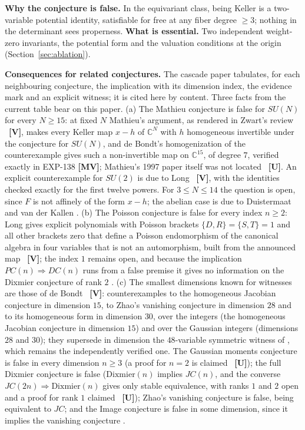 \documentclass[11pt]{article}
\theoremstyle{definition}
\theoremstyle{remark}
\newcommand{\C}{\mathbb{C}}
\newcommand{\MV}{\textbf{[MV]}}
\newcommand{\VV}{\textbf{[V]}}
\newcommand{\UU}{\textbf{[U]}}
\begin{document}
\textbf{Why the conjecture is false.} In the equivariant class, being Keller is a two-variable potential identity, satisfiable for free at any fiber degree $\ge 3$; nothing in the determinant sees properness. \textbf{What is essential.} Two independent weight-zero invariants, the potential form and the valuation conditions at the origin (Section~\ref{sec:ablation}).

\textbf{Consequences for related conjectures.} The cascade paper \cite{SLcascade} tabulates, for each neighbouring conjecture, the implication with its dimension index, the evidence mark and an explicit witness; it is cited here by content. Three facts from the current table bear on this paper. (a) The Mathieu conjecture is false for $SU(N)$ for every $N \ge 15$: at fixed $N$ Mathieu's argument, as rendered in Zwart's review \cite{Zwart2025}~\VV{}, makes every Keller map $x - h$ of $\C^N$ with $h$ homogeneous invertible under the conjecture for $SU(N)$, and de Bondt's homogenization of the counterexample \cite{deBondt2026} gives such a non-invertible map on $\C^{15}$, of degree $7$, verified exactly in EXP-138 \MV; Mathieu's 1997 paper itself was not located \cite{Mathieu1997}~\UU{}. An explicit counterexample for $SU(2)$ is due to Long \cite{LongSU2}~\VV{}, with the identities checked exactly for the first twelve powers. For $3 \le N \le 14$ the question is open, since $F$ is not affinely of the form $x - h$; the abelian case is due to Duistermaat and van der Kallen \cite{DvdK1998}. (b) The Poisson conjecture is false for every index $n \ge 2$: Long gives explicit polynomials with Poisson brackets $\{D,R\} = \{S,T\} = 1$ and all other brackets zero that define a Poisson endomorphism of the canonical algebra in four variables that is not an automorphism, built from the announced map \cite{LongPoisson}~\VV{}; the index $1$ remains open, and because the implication $PC(n) \Rightarrow DC(n)$ runs from a false premise it gives no information on the Dixmier conjecture of rank $2$ \cite{AvdE2007}. (c) The smallest dimensions known for witnesses are those of de Bondt \cite{deBondt2026}~\VV{}: counterexamples to the homogeneous Jacobian conjecture in dimension $15$, to Zhao's vanishing conjecture in dimension $28$ and to its homogeneous form in dimension $30$, over the integers (the homogeneous Jacobian conjecture in dimension $15$) and over the Gaussian integers (dimensions $28$ and $30$); they supersede in dimension the $48$-variable symmetric witness of \cite{SLcascade}, which remains the independently verified one. The Gaussian moments conjecture is false in every dimension $n \ge 3$ \cite{DEZ2017, LongGMC} (a proof for $n = 2$ is claimed \cite{Wilson2026}~\UU{}); the full Dixmier conjecture is false ($\mathrm{Dixmier}(n)$ implies $JC(n)$, and the converse $JC(2n) \Rightarrow \mathrm{Dixmier}(n)$ \cite{BKK2007, Tsuchimoto2005} gives only stable equivalence, with ranks $1$ and $2$ open and a proof for rank $1$ claimed \cite{Zheglov2024}~\UU{}); Zhao's vanishing conjecture is false, being equivalent to $JC$; and the Image conjecture is false in some dimension, since it implies the vanishing conjecture \cite{vdE2010}.
\end{document}
